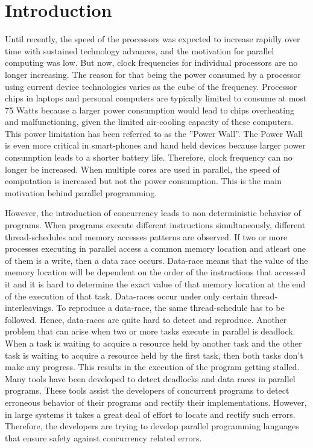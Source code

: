 \section{Introduction}

Until recently, the speed of the processors was expected to increase rapidly over time with sustained technology advances, and the motivation for parallel computing was low. But now, clock frequencies for individual processors are no longer increasing. The reason for that being the power consumed by a processor using current device technologies varies as the cube of the frequency. Processor chips in laptops and personal computers are typically limited to consume at most 75 Watts because a larger power consumption would lead to chips overheating and malfunctioning, given the limited air-cooling capacity of these computers. This power limitation has been referred to as the ''Power Wall''. The Power Wall is even more critical in smart-phones and hand held devices because larger power consumption leads to a shorter battery life. Therefore, clock frequency can no longer be increased. When multiple cores are used in parallel, the speed of computation is increased but not the power consumption. This is the main motivation behind parallel programming.

 However, the introduction of concurrency leads to non deterministic behavior of programs. When programs execute different instructions simultaneously, different thread-schedules and memory accesses patterns are observed. If two or more processes executing in parallel access a common memory location and atleast one of them is a write, then a data race occurs. Data-race means that the value of the memory location will be dependent on the order of the instructions that accessed it and it is hard to determine the exact value of that memory location at the end of the execution of that task. Data-races occur under only certain thread-interleavings. To reproduce a data-race, the same thread-schedule has to be followed. Hence, data-races are quite hard to detect and reproduce. Another problem that can arise when two or more tasks execute in parallel is deadlock. When a task is waiting to acquire a resource held by another task and the other task is waiting to acquire a resource held by the first task, then both tasks don't make any progress. This results in the execution of the program getting stalled. Many tools have been developed to detect deadlocks and data races in parallel programs. These tools assist the developers of concurrent programs to detect erroneous behavior of their programs and rectify their implementations. However, in large systems it takes a great deal of effort to locate and rectify such errors. Therefore, the developers are trying to develop parallel programming languages that ensure safety against concurrency related errors. 
 
